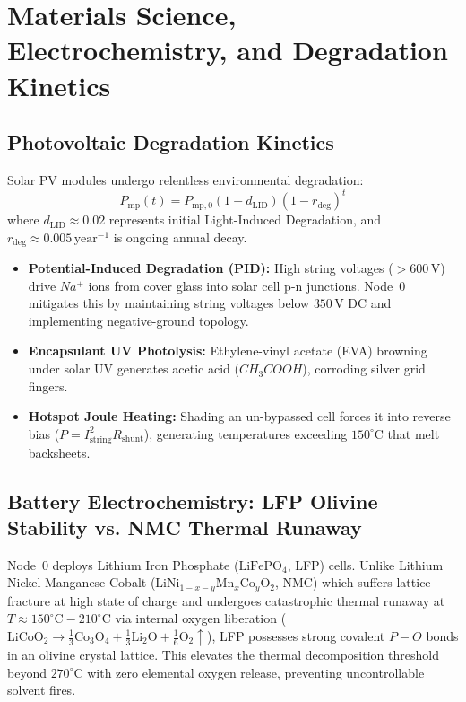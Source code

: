 \section{Materials Science, Electrochemistry, and Degradation Kinetics}
\label{sec:l1_materials}

\subsection{Photovoltaic Degradation Kinetics}

Solar PV modules undergo relentless environmental degradation:
\begin{equation}
P_{\mathrm{mp}}(t) = P_{\mathrm{mp},0} \left(1 - d_{\mathrm{LID}}\right) (1 - r_{\mathrm{deg}})^t
\label{eq:pv_degradation}
\end{equation}
where $d_{\mathrm{LID}} \approx 0.02$ represents initial Light-Induced Degradation, and $r_{\mathrm{deg}} \approx 0.005\,\mathrm{year}^{-1}$ is ongoing annual decay.
\begin{itemize}
    \item \textbf{Potential-Induced Degradation (PID):} High string voltages ($>600\,\mathrm{V}$) drive $Na^+$ ions from cover glass into solar cell p-n junctions. Node~0 mitigates this by maintaining string voltages below $350\,\mathrm{V}$ DC and implementing negative-ground topology.
    \item \textbf{Encapsulant UV Photolysis:} Ethylene-vinyl acetate (EVA) browning under solar UV generates acetic acid ($CH_3COOH$), corroding silver grid fingers.
    \item \textbf{Hotspot Joule Heating:} Shading an un-bypassed cell forces it into reverse bias ($P = I_{\mathrm{string}}^2 R_{\mathrm{shunt}}$), generating temperatures exceeding $150^\circ\mathrm{C}$ that melt backsheets.
\end{itemize}

\subsection{Battery Electrochemistry: LFP Olivine Stability vs. NMC Thermal Runaway}

Node~0 deploys Lithium Iron Phosphate ($\mathrm{LiFePO}_4$, LFP) cells. Unlike Lithium Nickel Manganese Cobalt ($\mathrm{LiNi}_{1-x-y}\mathrm{Mn}_x \mathrm{Co}_y \mathrm{O}_2$, NMC) which suffers lattice fracture at high state of charge and undergoes catastrophic thermal runaway at $T \approx 150^\circ\mathrm{C}-210^\circ\mathrm{C}$ via internal oxygen liberation ($\mathrm{LiCoO}_2 \to \frac{1}{3}\mathrm{Co}_3 \mathrm{O}_4 + \frac{1}{3}\mathrm{Li}_2 \mathrm{O} + \frac{1}{6}\mathrm{O}_2 \uparrow$), LFP possesses strong covalent $P-O$ bonds in an olivine crystal lattice. This elevates the thermal decomposition threshold beyond $270^\circ\mathrm{C}$ with zero elemental oxygen release, preventing uncontrollable solvent fires.

